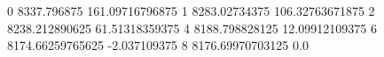 0 8337.796875 161.09716796875
1 8283.02734375 106.32763671875
2 8238.212890625 61.51318359375
4 8188.798828125 12.09912109375
6 8174.66259765625 -2.037109375
8 8176.69970703125 0.0
